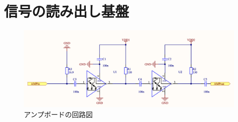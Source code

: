 \section{信号の読み出し基盤}

\begin{figure}[h]
    \centering
    \includegraphics[width=12cm]{fig/ch3/Amp.png}
    \caption{アンプボードの回路図}
    \label{fg:Amp}
\end{figure}